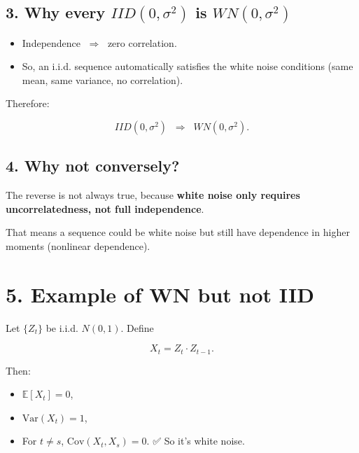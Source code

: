 \documentclass[
  11pt,
  a4paper,
]{report}
\providecommand{\tightlist}{%
  \setlength{\itemsep}{0pt}\setlength{\parskip}{0pt}}\usepackage{longtable,booktabs,array}
\begin{document}
\subsection{\texorpdfstring{3. Why every \(IID(0, \sigma^2)\) is
\(WN(0, \sigma^2)\)}{3. Why every IID(0, \textbackslash sigma\^{}2) is WN(0, \textbackslash sigma\^{}2)}}\label{why-every-iid0-sigma2-is-wn0-sigma2}

\begin{itemize}
\tightlist
\item
  Independence \(\;\Rightarrow\;\) zero correlation.\\
\item
  So, an i.i.d. sequence automatically satisfies the white noise
  conditions (same mean, same variance, no correlation).
\end{itemize}

Therefore:

\[
IID(0, \sigma^2) \;\;\Rightarrow\;\; WN(0, \sigma^2).
\]

\subsection{4. Why not conversely?}\label{why-not-conversely}

The reverse is not always true, because \textbf{white noise only
requires uncorrelatedness, not full independence}.

That means a sequence could be white noise but still have dependence in
higher moments (nonlinear dependence).

\section{5. Example of WN but not IID}\label{example-of-wn-but-not-iid}

Let \(\{Z_t\}\) be i.i.d. \(N(0,1)\). Define

\[
X_t = Z_t \cdot Z_{t-1}.
\]

Then:

\begin{itemize}
\tightlist
\item
  \(\mathbb{E}[X_t] = 0\),\\
\item
  \(\mathrm{Var}(X_t) = 1\),\\
\item
  For \(t \neq s\), \(\mathrm{Cov}(X_t, X_s) = 0\). ✅ So it's white
  noise.
\end{itemize}
\end{document}
